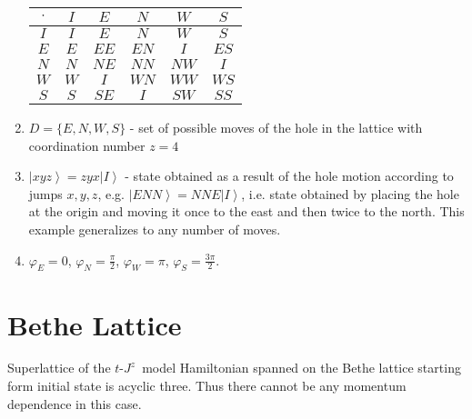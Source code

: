 \documentclass{article}
\newcommand{\tjzm}{$t$-$J^z$~model}
\newcommand{\ket}[1]{\left\vert #1 \right\rangle}
\begin{document}
\begin{enumerate}
    \begin{center}
        \begin{tabular}{c | c c c c c }
            $\cdot$  
                     & $I$ & $E$  & $N$  & $W$  & $S$  \\ 
            \hline
            $I$      & $I$ & $E$  & $N$  & $W$  & $S$  \\
            $E$      & $E$ & $EE$ & $EN$ & $I$  & $ES$ \\
            $N$      & $N$ & $NE$ & $NN$ & $NW$ & $I$  \\
            $W$      & $W$ & $I$  & $WN$ & $WW$ & $WS$ \\
            $S$      & $S$ & $SE$ & $I$  & $SW$ & $SS$
        \end{tabular}        
    \end{center}
    
    \item $D = \{E, N, W, S\}$ - set of possible moves of the hole in the lattice with coordination number $z = 4$
    
    \item $\ket{xyz} = zyx\ket{I}$ - state obtained as a result of the hole motion according to jumps $x, y, z$, e.g. $\ket{ENN} = NNE\ket{I}$, i.e. state obtained by placing the hole at the origin and moving it once to the east and then twice to the north. This example generalizes to any number of moves.

    \item $\varphi_E = 0$, $\varphi_N = \frac{\pi}{2}$, $\varphi_W = \pi$, $\varphi_S = \frac{3\pi}{2}$.
    
\end{enumerate}

\section{Bethe Lattice}
Superlattice of the \tjzm{} Hamiltonian spanned on the Bethe lattice starting form initial state is acyclic three. Thus there cannot be any momentum dependence in this case.
\end{document}
